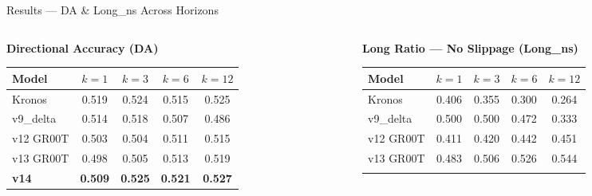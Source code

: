 \documentclass[aspectratio=169,11pt]{beamer}
\newcommand{\best}[1]{\textcolor{bestcol}{\textbf{#1}}}
\begin{document}
\begin{frame}{Results --- DA \& Long\_ns Across Horizons}
  \begin{columns}
    \begin{column}{0.48\textwidth}
      \centering\textbf{Directional Accuracy (DA)}
      \vspace{0.3em}
      \begin{table}
        \centering
        \renewcommand{\arraystretch}{1.25}
        \setlength{\tabcolsep}{4pt}
        \begin{tabular}{lcccc}
          \toprule
          \textbf{Model} & $k{=}1$ & $k{=}3$ & $k{=}6$ & $k{=}12$ \\
          \midrule
          \rowcolor{rowgray}
          Kronos    & 0.519 & 0.524 & 0.515 & 0.525 \\
          v9\_delta & 0.514 & 0.518 & 0.507 & 0.486 \\
          \rowcolor{rowgray}
          v12 GR00T & 0.503 & 0.504 & 0.511 & 0.515 \\
          v13 GR00T & 0.498 & 0.505 & 0.513 & 0.519 \\
          \rowcolor{rowgray}
          \textbf{v14}  & \best{0.509} & \best{0.525} & \best{0.521} & \best{0.527} \\
          \bottomrule
        \end{tabular}
      \end{table}
    \end{column}
    \begin{column}{0.48\textwidth}
      \centering\textbf{Long Ratio --- No Slippage (Long\_ns)}
      \vspace{0.3em}
      \begin{table}
        \centering
        \renewcommand{\arraystretch}{1.25}
        \setlength{\tabcolsep}{4pt}
        \begin{tabular}{lcccc}
          \toprule
          \textbf{Model} & $k{=}1$ & $k{=}3$ & $k{=}6$ & $k{=}12$ \\
          \midrule
          \rowcolor{rowgray}
          Kronos    & 0.406 & 0.355 & 0.300 & 0.264 \\
          v9\_delta & 0.500 & 0.500 & 0.472 & 0.333 \\
          \rowcolor{rowgray}
          v12 GR00T & 0.411 & 0.420 & 0.442 & 0.451 \\
          v13 GR00T & 0.483 & 0.506 & 0.526 & 0.544 \\
          \rowcolor{rowgray}

\end{tabular}
\end{table}
\end{column}
\end{columns}
\end{frame}
\end{document}
